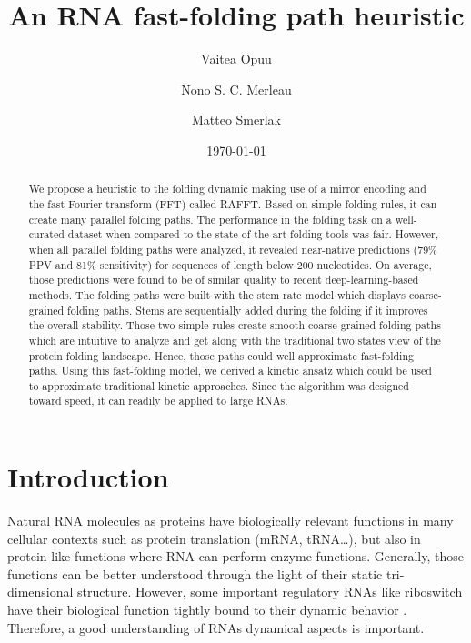 \documentclass[a4paper,12pt]{article}
\author[]{Vaitea Opuu}
\author[]{Nono S. C. Merleau}
\author[]{Matteo Smerlak}
\affil[]{Max Planck Institute for Mathematics in the Sciences, Leipzig, Germany}
\date{\today}
\title{An RNA fast-folding path heuristic}
\begin{document}
\maketitle
\begin{abstract}

We propose a heuristic to the folding dynamic making use of a mirror encoding
and the fast Fourier transform (FFT) called RAFFT. Based on simple folding
rules, it can create many parallel folding paths. The performance in the folding
task on a well-curated dataset when compared to the state-of-the-art folding
tools was fair. However, when all parallel folding paths were analyzed, it
revealed near-native predictions (79\% PPV and 81\% sensitivity) for sequences of
length below 200 nucleotides. On average, those predictions were found to be of
similar quality to recent deep-learning-based methods. The folding paths were
built with the stem rate model which displays coarse-grained folding paths.
Stems are sequentially added during the folding if it improves the overall
stability. Those two simple rules create smooth coarse-grained folding paths
which are intuitive to analyze and get along with the traditional two states
view of the protein folding landscape. Hence, those paths could well approximate
fast-folding paths. Using this fast-folding model, we derived a kinetic ansatz which
could be used to approximate traditional kinetic approaches. Since the algorithm was
designed toward speed, it can readily be applied to large RNAs.

\end{abstract}

\section*{Introduction}
\label{sec:orgabfc459}
Natural RNA molecules as proteins have biologically relevant functions in many
cellular contexts such as protein translation (mRNA, tRNA\ldots{}), but also in
protein-like functions where RNA can perform enzyme functions. Generally, those
functions can be better understood through the light of their static
tri-dimensional structure. However, some important regulatory RNAs like
riboswitch have their biological function tightly bound to their dynamic
behavior \cite{vitreschak04_ribos}. Therefore, a good understanding of RNAs
dynamical aspects is important.
\end{document}
